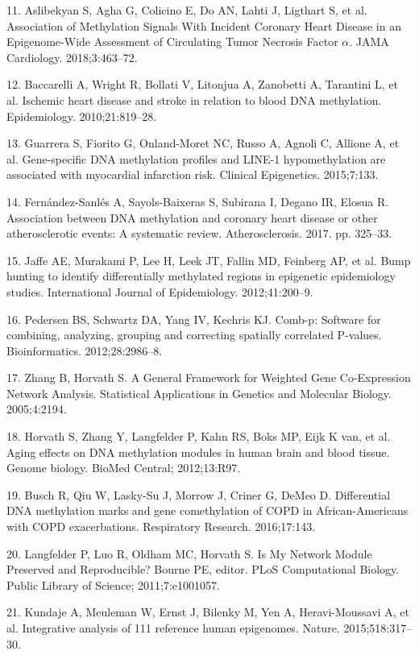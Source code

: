 \documentclass[]{bmcart}
\theoremstyle{definition}
\theoremstyle{definition}
\theoremstyle{definition}
\theoremstyle{remark}
\begin{document}
11. Aslibekyan S, Agha G, Colicino E, Do AN, Lahti J, Ligthart S, et al.
Association of Methylation Signals With Incident Coronary Heart Disease
in an Epigenome-Wide Assessment of Circulating Tumor Necrosis Factor
\(\alpha\). JAMA Cardiology. 2018;3:463--72.

12. Baccarelli A, Wright R, Bollati V, Litonjua A, Zanobetti A,
Tarantini L, et al. Ischemic heart disease and stroke in relation to
blood DNA methylation. Epidemiology. 2010;21:819--28.

13. Guarrera S, Fiorito G, Onland-Moret NC, Russo A, Agnoli C, Allione
A, et al. Gene-specific DNA methylation profiles and LINE-1
hypomethylation are associated with myocardial infarction risk. Clinical
Epigenetics. 2015;7:133.

14. Fern{á}ndez-Sanl{é}s A, Sayols-Baixeras S, Subirana I, Degano IR,
Elosua R. Association between DNA methylation and coronary heart disease
or other atherosclerotic events: A systematic review. Atherosclerosis.
2017. pp. 325--33.

15. Jaffe AE, Murakami P, Lee H, Leek JT, Fallin MD, Feinberg AP, et al.
Bump hunting to identify differentially methylated regions in epigenetic
epidemiology studies. International Journal of Epidemiology.
2012;41:200--9.

16. Pedersen BS, Schwartz DA, Yang IV, Kechris KJ. Comb-p: Software for
combining, analyzing, grouping and correcting spatially correlated
P-values. Bioinformatics. 2012;28:2986--8.

17. Zhang B, Horvath S. A General Framework for Weighted Gene
Co-Expression Network Analysis. Statistical Applications in Genetics and
Molecular Biology. 2005;4:2194.

18. Horvath S, Zhang Y, Langfelder P, Kahn RS, Boks MP, Eijk K van, et
al. Aging effects on DNA methylation modules in human brain and blood
tissue. Genome biology. BioMed Central; 2012;13:R97.

19. Busch R, Qiu W, Lasky-Su J, Morrow J, Criner G, DeMeo D.
Differential DNA methylation marks and gene comethylation of COPD in
African-Americans with COPD exacerbations. Respiratory Research.
2016;17:143.

20. Langfelder P, Luo R, Oldham MC, Horvath S. Is My Network Module
Preserved and Reproducible? Bourne PE, editor. PLoS Computational
Biology. Public Library of Science; 2011;7:e1001057.

21. Kundaje A, Meuleman W, Ernst J, Bilenky M, Yen A, Heravi-Moussavi A,
et al. Integrative analysis of 111 reference human epigenomes. Nature.
2015;518:317--30.
\end{document}
